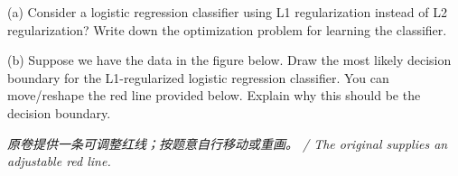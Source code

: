 (a) Consider a logistic regression classifier using L1 regularization instead of L2 regularization? Write down the optimization problem for learning the classifier.


(b) Suppose we have the data in the figure below. Draw the most likely decision boundary for the L1-regularized logistic regression classifier. You can move/reshape the red line provided below. Explain why this should be the decision boundary.




\emph{原卷提供一条可调整红线；按题意自行移动或重画。 / The original supplies an adjustable red line.}
